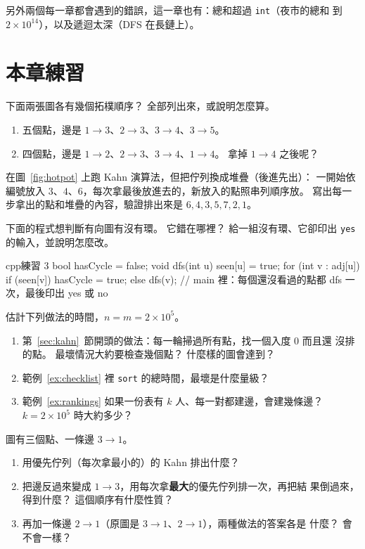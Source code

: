 另外兩個每一章都會遇到的錯誤，這一章也有：總和超過 \texttt{int}（夜市的總和
到 $2 \times 10^{14}$），以及遞迴太深（DFS 在長鏈上）。

\section{本章練習}
\label{sec:ch18-exercises}

\begin{drills}[label=drills:ch18]
\item 下面兩張圖各有幾個拓樸順序？ 全部列出來，或說明怎麼算。
\begin{enumerate}
\item 五個點，邊是 $1 \to 3$、$2 \to 3$、$3 \to 4$、$3 \to 5$。
\item 四個點，邊是 $1 \to 2$、$2 \to 3$、$3 \to 4$、$1 \to 4$。 拿掉
$1 \to 4$ 之後呢？
\end{enumerate}

\item 在圖~\ref{fig:hotpot} 上跑 Kahn 演算法，但把佇列換成堆疊（後進先出）：
一開始依編號放入 $3$、$4$、$6$，每次拿最後放進去的，新放入的點照串列順序放。
寫出每一步拿出的點和堆疊的內容，驗證排出來是 $6, 4, 3, 5, 7, 2, 1$。

\item 下面的程式想判斷有向圖有沒有環。 它錯在哪裡？ 給一組沒有環、它卻印出
\texttt{yes} 的輸入，並說明怎麼改。
\begin{code}{cpp}{練習 3}
bool hasCycle = false;
void dfs(int u) {
    seen[u] = true;
    for (int v : adj[u]) {
        if (seen[v]) {
            hasCycle = true;
        } else {
            dfs(v);
        }
    }
}
// main 裡：每個還沒看過的點都 dfs 一次，最後印出 yes 或 no
\end{code}

\item 估計下列做法的時間，$n = m = 2 \times 10^5$。
\begin{enumerate}
\item 第~\ref{sec:kahn}~節開頭的做法：每一輪掃過所有點，找一個入度 $0$ 而且還
沒排的點。 最壞情況大約要檢查幾個點？ 什麼樣的圖會達到？
\item 範例~\ref{ex:checklist} 裡 \texttt{sort} 的總時間，最壞是什麼量級？
\item 範例~\ref{ex:rankings} 如果一份表有 $k$ 人、每一對都建邊，會建幾條邊？
$k = 2 \times 10^5$ 時大約多少？
\end{enumerate}

\item 圖有三個點、一條邊 $3 \to 1$。
\begin{enumerate}
\item 用優先佇列（每次拿最小的）的 Kahn 排出什麼？
\item 把邊反過來變成 $1 \to 3$，用每次拿\textbf{最大}的優先佇列排一次，再把結
果倒過來，得到什麼？ 這個順序有什麼性質？
\item 再加一條邊 $2 \to 1$（原圖是 $3 \to 1$、$2 \to 1$），兩種做法的答案各是
什麼？ 會不會一樣？
\end{enumerate}


\end{drills}
